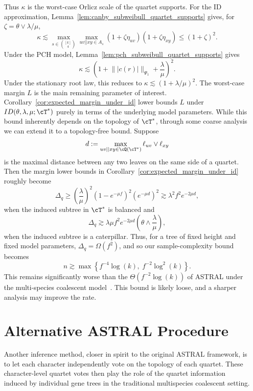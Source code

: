 \noindent Thus $\kappa$ is the worst-case Orlicz scale of the quartet supports.
For the ID approximation, Lemma~\ref{lem:canby_subweibull_quartet_supports} gives, for
$\zeta=\theta\vee\lambda/\mu$,
%
\[\kappa\lesssim\max_{s\in{[k]\choose4}}\max_{uv||xy\in A_s}
(1+\zeta\eta_{uv})(1+\zeta\eta_{xy})\leq(1+\zeta)^2.\]
%
\noindent Under the PCH model, Lemma~\ref{lem:pch_subweibull_quartet_supports} gives
%
\[\kappa\lesssim\left(1+\bigl\||c(r)|\bigr\|_{\Psi_1}+\frac{\lambda}{\mu}\right)^2.\]
%
\noindent Under the stationary root law, this reduces to
$\kappa\lesssim(1+\lambda/\mu)^2$.
%
\noindent The worst-case margin $L$ is the main remaining parameter of interest.
Corollary~\ref{cor:expected_margin_under_id} lower bounds $L$ under $ID(\theta, \lambda, \mu; \cT^*)$
purely in terms of the underlying model parameters. While this bound inherently depends on the topology of $\cT^*$,
through some coarse analysis we can extend it to a topology-free bound. Suppose
%
    \[d := \max_{uv||xy \in \cQ(\cT^*)} \ell_{uv} \vee \ell_{xy}\]
%
\noindent is the maximal distance between any two leaves on the same side of a quartet.
Then the margin lower bounds in Corollary~\ref{cor:expected_margin_under_id} roughly become
%
    \[\Delta_q \geq \left(\frac{\lambda}{\mu}\right)^2 (1-e^{-\mu f})^2 (e^{-\mu d})^2 \gtrsim \lambda^2 f^2 e^{-2\mu d}, \]
%
\noindent when the induced subtree in $\cT^*$ is balanced and
%
        \[\Delta_q \gtrsim \lambda\mu f^2 e^{-2\mu d} \left(\theta \wedge \frac{\lambda}{\mu}\right), \]
%
\noindent when the induced subtree is a caterpillar. Thus, for a tree of fixed height and fixed model parameters,
$\Delta_q = \Omega(f^2)$, and so our sample-complexity bound becomes
%
    \[n \gtrsim \max\left\{f^{-4} \log(k), \; f^{-2} \log^2(k)\right\}.\]
%
\noindent This remains significantly worse than the $\Theta(f^{-2} \log(k))$ of ASTRAL under the multi-species coalescent model~\cite{shekhar2018_how_many_genes_are_enough}. This bound is likely loose, and a sharper analysis may improve the rate.



\section{Alternative ASTRAL Procedure}
\label{sec:canby_alternative_astral_procedure}

Another inference method, closer in spirit to the original ASTRAL framework, is to let each
character independently vote on the topology of each quartet. These character-level quartet
votes then play the role of the quartet information induced by individual gene trees in the
traditional multispecies coalescent setting.


